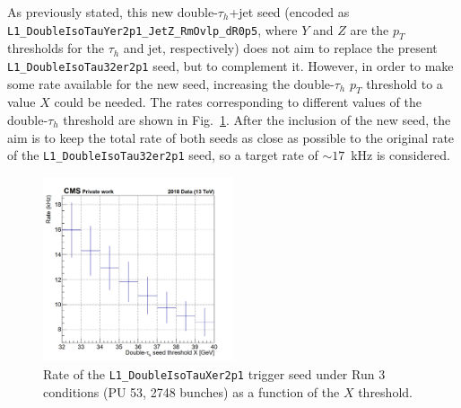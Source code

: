 \documentclass[../main.tex]{subfiles}
\begin{document}
As previously stated, this new double-$\tau_h$+jet seed (encoded as \texttt{L1\_Double\-IsoTauY\-er2p1\-\_JetZ\_RmOvlp\_dR0p5}, where $Y$ and $Z$ are the $p_T$ thresholds for the $\tau_h$ and jet, respectively) does not aim to replace the present \texttt{L1\_Double\-Iso\-Tau32er2p1} seed, but to complement it. However, in order to make some rate available for the new seed, increasing the double-$\tau_h$ $p_T$ threshold to a value $X$ could be needed. The rates corresponding to different values of the double-$\tau_h$ threshold are shown in Fig.~\ref{hh:fig:trig_ditau32_rate}. After the inclusion of the new seed, the aim is to keep the total rate of both seeds as close as possible to the original rate of the \texttt{L1\_Double\-Iso\-Tau32er2p1} seed, so a target rate of $\sim17$~kHz is considered.

\begin{figure}[h!]
\begin{center}
\includegraphics[width=0.5\textwidth]{Images/plot2D_ditau_sym_323755}
\end{center}
\caption[\texttt{L1\_DoubleIsoTauXer2p1} trigger seed rate]{Rate of the \texttt{L1\_DoubleIsoTauXer2p1} trigger seed under Run 3 conditions (PU 53, 2748 bunches) as a function of the $X$ threshold.}
\label{hh:fig:trig_ditau32_rate}
\end{figure}
\end{document}
